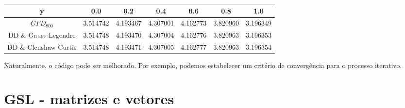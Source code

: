 \begin{table}[ht]
\centering
\label{tab1}
\begin{tabular}{|c|c|c|c|c|c|c|}
\hline
y           & 0.0      & 0.2      & 0.4      & 0.6      & 0.8      & 1.0      \\ \hline
$GFD_{800}$ & 3.514742 & 4.193467 & 4.307001 & 4.162773 & 3.820960 & 3.196349 \\ \hline
DD \& Gauss-Legendre         & 3.514748 & 4.193470 & 4.307004 & 4.162776 & 3.820963 & 3.196353 \\ \hline
DD \& Clenshaw-Curtis         & 3.514748 & 4.193471 & 4.307005 & 4.162777 & 3.820963 & 3.196354 \\ \hline
\end{tabular}
\end{table}

Naturalmente, o código pode ser melhorado. Por exemplo, podemos estabelecer um critério de convergência para o processo iterativo.

\section{GSL - matrizes e vetores}

